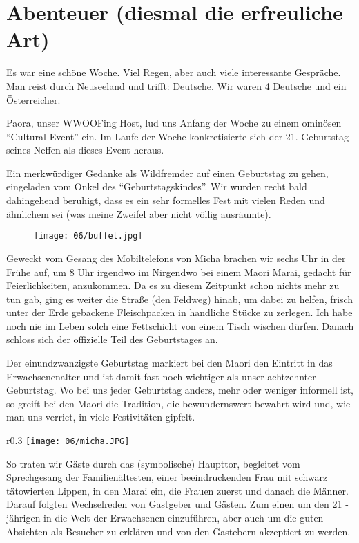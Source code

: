 \chapter{Abenteuer (diesmal die erfreuliche Art)}

Es war eine schöne Woche. Viel Regen, aber auch viele interessante
Gespräche. Man reist durch Neuseeland und trifft: Deutsche. Wir waren 4
Deutsche und ein Österreicher.

Paora, unser WWOOFing Host, lud uns Anfang der Woche zu einem ominösen
``Cultural Event'' ein. Im Laufe der Woche konkretisierte sich der
21. Geburtstag seines Neffen als dieses Event heraus.

Ein merkwürdiger Gedanke als Wildfremder auf einen Geburtstag zu
gehen, eingeladen vom Onkel des ``Geburtstagskindes''. Wir wurden recht
bald dahingehend beruhigt, dass es ein sehr formelles Fest mit vielen
Reden und ähnlichem sei (was meine Zweifel aber nicht völlig
ausräumte).

\begin{figure}[h]
  \centering
  \texttt{[image: 06/buffet.jpg]}
\end{figure}
Geweckt vom Gesang des Mobiltelefons von Micha brachen wir sechs Uhr
in der Frühe auf, um 8 Uhr irgendwo im Nirgendwo bei einem Maori
Marai, gedacht für Feierlichkeiten, anzukommen. Da es zu diesem
Zeitpunkt schon nichts mehr zu tun gab, ging es weiter die Straße (den
Feldweg) hinab, um dabei zu helfen, frisch unter der Erde gebackene
Fleischpacken in handliche Stücke zu zerlegen. Ich habe noch nie im
Leben solch eine Fettschicht von einem Tisch wischen dürfen. Danach
schloss sich der offizielle Teil des Geburtstages an.

Der einundzwanzigste Geburtstag markiert bei den Maori den Eintritt in
das Erwachsenenalter und ist damit fast noch wichtiger als unser
achtzehnter Geburtstag. Wo bei uns jeder Geburtstag anders, mehr oder
weniger informell ist, so greift bei den Maori die Tradition, die
bewundernswert bewahrt wird und, wie man uns verriet, in viele
Festivitäten gipfelt.

\begin{wrapfigure}{r}{0.3\textwidth}
  \centering
  \texttt{[image: 06/micha.JPG]}
\end{wrapfigure}
So traten wir Gäste durch das (symbolische) Haupttor, begleitet vom
Sprechgesang der Familienältesten, einer beeindruckenden Frau mit
schwarz tätowierten Lippen, in den Marai ein, die Frauen zuerst und
danach die Männer. Darauf folgten Wechselreden von Gastgeber und
Gästen. Zum einen um den 21 -jährigen in die Welt der Erwachsenen
einzuführen, aber auch um die guten Absichten als Besucher zu erklären
und von den Gastebern akzeptiert zu werden.

